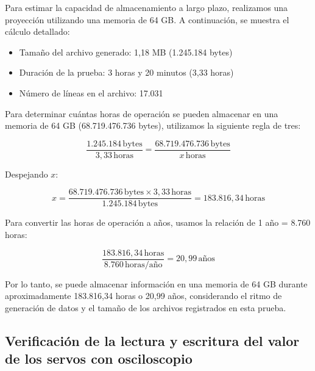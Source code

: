         Para estimar la capacidad de almacenamiento a largo plazo, realizamos una proyección utilizando una memoria de 64 GB. A continuación, se muestra el cálculo detallado:

        \vspace{5 px}
        \begin{itemize}
            \item Tamaño del archivo generado: 1,18 MB (1.245.184 bytes)
            \item Duración de la prueba: 3 horas y 20 minutos (3,33 horas)
            \item Número de líneas en el archivo: 17.031
        \end{itemize}
        \vspace{5 px}
        Para determinar cuántas horas de operación se pueden almacenar en una memoria de 64 GB (68.719.476.736 bytes), utilizamos la siguiente regla de tres:

        \begin{equation}
        \frac{1.245.184 \, \text{bytes}}{3,33 \, \text{horas}} = \frac{68.719.476.736 \, \text{bytes}}{x \, \text{horas}}
        \end{equation}

        Despejando \( x \):

        \begin{equation}
        x = \frac{68.719.476.736 \, \text{bytes} \times 3,33 \, \text{horas}}{1.245.184 \, \text{bytes}} = 183.816,34 \, \text{horas}
        \end{equation}

        Para convertir las horas de operación a años, usamos la relación de 1 año = 8.760 horas:

        \begin{equation}
        \frac{183.816,34 \, \text{horas}}{8.760 \, \text{horas/año}} = 20,99 \, \text{años}
        \end{equation}

        \vspace{5 px}
        Por lo tanto, se puede almacenar información en una memoria de 64 GB durante aproximadamente 183.816,34 horas o 20,99 años, considerando el ritmo de generación de datos y el tamaño de los archivos registrados en esta prueba.


    \subsection{Verificación de la lectura y escritura del valor de los servos con osciloscopio}

